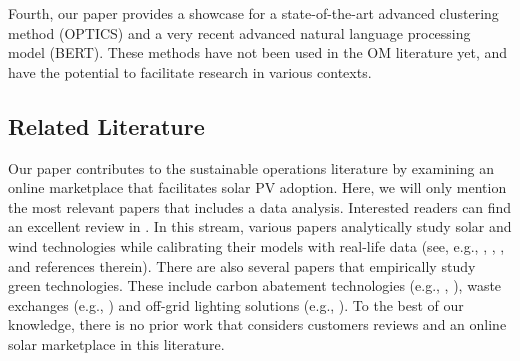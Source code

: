 \documentclass[msom,blindrev]{informs3}
\begin{document}
	Fourth, our paper provides a showcase for a state-of-the-art advanced clustering method (OPTICS) and a very recent advanced natural language processing model (BERT). These methods have not been used in the OM literature yet, and have the potential to facilitate research in various contexts.
	
	
	
	
	\subsection{Related Literature} \label{Sec: Lit}
	
	Our paper contributes to the sustainable operations literature by examining an online marketplace that facilitates solar PV adoption. Here, we will only mention the most relevant papers that includes a data analysis. Interested readers can find an excellent review in \cite{HLee}. In this stream, various papers analytically study solar and wind technologies while calibrating their models with real-life data (see, e.g., \cite{alanwolf}, \cite{NJ}, \cite{SunarandBirge}, and references therein). There are also several papers that empirically study green technologies. These include carbon abatement technologies (e.g., \cite{blanco2020carbon}, \cite{Corbett2}), waste exchanges (e.g., \cite{Suvrat}) and  off-grid lighting solutions (e.g., \cite{uppari}).
	To the best of our knowledge, there is no prior work that considers customers reviews and an online solar marketplace in this literature.
	
\end{document}
